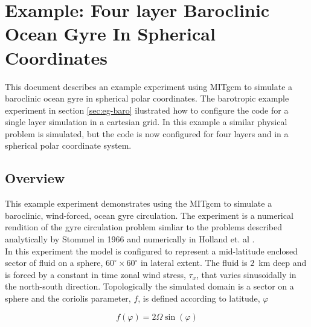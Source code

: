 
\section{Example: Four layer Baroclinic Ocean Gyre In Spherical Coordinates}
\label{sec:eg-fourlayer}


%
%

This document describes an example experiment using MITgcm
to simulate a baroclinic ocean gyre in spherical
polar coordinates. The barotropic
example experiment in section \ref{sec:eg-baro}
ilustrated how to configure the code for a single layer 
simulation in a cartesian grid. In this example a similar physical problem
is simulated, but the code is now configured
for four layers and in a spherical polar coordinate system.

\subsection{Overview}

This example experiment demonstrates using the MITgcm to simulate
a baroclinic, wind-forced, ocean gyre circulation. The experiment 
is a numerical rendition of the gyre circulation problem simliar
to the problems described analytically by Stommel in 1966 
\cite{Stommel66} and numerically in Holland et. al \cite{Holland75}.
\\

In this experiment the model is configured to represent a mid-latitude 
enclosed sector of fluid on a sphere, $60^{\circ} \times 60^{\circ}$ in 
lateral extent. The fluid is $2$~km deep and is forced
by a constant in time zonal wind stress, $\tau_x$, that varies sinusoidally
in the north-south direction. Topologically the simulated 
domain is a sector on a sphere and the coriolis parameter, $f$, is defined 
according to latitude, $\varphi$

\begin{equation}
\label{EQ:fcori}
f(\varphi) = 2 \Omega \sin( \varphi )
\end{equation}
 
